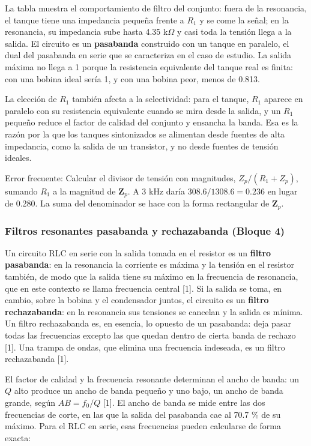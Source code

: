 \documentclass[11pt,letterpaper]{article}
\begin{document}
La tabla muestra el comportamiento de filtro del conjunto: fuera de la resonancia, el tanque tiene una impedancia pequeña frente a $R_1$ y \guillemotleft{}se come\guillemotright{} la señal; en la resonancia, su impedancia sube hasta 4.35 k\ensuremath{\Omega} y casi toda la tensión llega a la salida. El circuito es un \textbf{pasabanda} construido con un tanque en paralelo, el dual del pasabanda en serie que se caracteriza en el caso de estudio. La salida máxima no llega a 1 porque la resistencia equivalente del tanque real es finita: con una bobina ideal sería 1, y con una bobina peor, menos de 0.813.

La elección de $R_1$ también afecta a la selectividad: para el tanque, $R_1$ aparece en paralelo con su resistencia equivalente cuando se mira desde la salida, y un $R_1$ pequeño reduce el factor de calidad del conjunto y ensancha la banda. Esa es la razón por la que los tanques sintonizados se alimentan desde fuentes de alta impedancia, como la salida de un transistor, y no desde fuentes de tensión ideales.

\begin{nota}{Error frecuente:}
Calcular el divisor de tensión con magnitudes, $Z_p/(R_1 + Z_p)$, sumando $R_1$ a la magnitud de $\mathbf{Z}_p$. A 3 kHz daría $308.6/1308.6 = 0.236$ en lugar de 0.280. La suma del denominador se hace con la forma rectangular de $\mathbf{Z}_p$.
\end{nota}

\subsubsection{Filtros resonantes pasabanda y rechazabanda (Bloque 4)}

Un circuito RLC en serie con la salida tomada en el resistor es un \textbf{filtro pasabanda}: en la resonancia la corriente es máxima y la tensión en el resistor también, de modo que la salida tiene su máximo en la frecuencia de resonancia, que en este contexto se llama frecuencia central [1]. Si la salida se toma, en cambio, sobre la bobina y el condensador juntos, el circuito es un \textbf{filtro rechazabanda}: en la resonancia sus tensiones se cancelan y la salida es mínima. Un filtro rechazabanda es, en esencia, lo opuesto de un pasabanda: deja pasar todas las frecuencias excepto las que quedan dentro de cierta banda de rechazo [1]. Una trampa de ondas, que elimina una frecuencia indeseada, es un filtro rechazabanda [1].

El factor de calidad y la frecuencia resonante determinan el ancho de banda: un $Q$ alto produce un ancho de banda pequeño y uno bajo, un ancho de banda grande, según $AB = f_0/Q$ [1]. El ancho de banda se mide entre las dos frecuencias de corte, en las que la salida del pasabanda cae al 70.7 \% de su máximo. Para el RLC en serie, esas frecuencias pueden calcularse de forma exacta:
\end{document}
